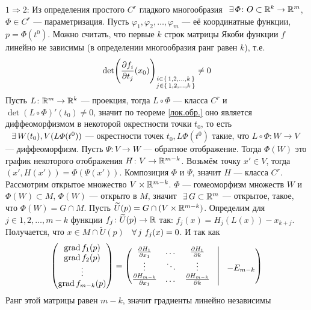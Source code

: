 \begin{prf}
	$1 \Rightarrow 2$: Из определения простого $C^r$ гладкого многообразия$\E \varPhi \colon O \subset \rr^k \to \rmm$, $\varPhi \in C^r$ --- параметризация. Пусть $\varphi_1, \varphi_2, \ldots, \varphi_m$ --- её координатные функции, $p = \varPhi(t^0)$. Можно считать, что первые $k$ строк матрицы Якоби функции $f$ линейно не зависимы (в определении многообразия ранг равен $k$), т.е.\[\det \Biggl(\frac{\partial f_i}{\partial t_j} (x_0)\Biggr)_{\substack{i \in \{\,1, 2, \ldots, k \, \} \\ j \in \{\,1, 2, \ldots, k \, \}}} \ne 0\]
	Пусть $L \colon \mathbb R^m \to \mathbb R^k$ --- проекция, тогда $L \circ \varPhi$ --- класса $C^r$ и $\det (L \circ \varPhi)'(t_0) \ne 0$, значит по теореме \ref{лок.обр.} оно является диффеоморфизмом в некоторой окрестности точки $t_0$, то есть$\E W(t_0), V(L\varPhi(t^0))$ --- окрестности точек $t_0, L\varPhi(t^0)$ такие, что $L \circ \varPhi \colon W \to V$ --- диффеоморфизм. Пусть $\Psi \colon V \to W$ --- обратное отображение. Тогда $\varPhi(W)$ это график некоторого отображения $H \colon V \to \mathbb R^{m - k}$. Возьмём точку $x' \in V$, тогда $(x', H(x')) = \varPhi(\Psi(x'))$. Композиция $\varPhi$ и $\Psi$, значит $H$ --- класса $C^r$. Рассмотрим открытое множество $V \times \mathbb R^{m - k}$. $\varPhi$ --- гомеоморфизм множеств $W$ и $\varPhi(W) \subset M$, $\varPhi(W)$ --- открыто в $M$, значит$\E G \subset \rmm$ --- открытое, такое, что $\varPhi(W) = G \cap M$. Пусть $\widetilde U(p) = G \cap (V \times \mathbb R^{m - k})$. Определим для $j \in {1, 2, \ldots, m - k}$ функции $f_j \colon \widetilde U(p) \to \mathbb R$ так: $f_j(x) = H_j(L(x)) - x_{k + j}$.
	Получается, что $x \in M \cap \widetilde U(p)$ \eq\ 
	$\forall \, j\ f_j(x) = 0$. И так как
	\[\begin{pmatrix}
		\grad f_1(p) \\
		\grad f_2(p) \\
		\vdots \\
		\grad f_{m - k}(p) \\
	\end{pmatrix} = \begin{pmatrix}
	\pfrac{H_1}{x_1} & \dots & \pfrac{H_1}{k} & \vline& \\
	\vdots & \ddots & \vdots & \vline & -E_{m - k}\\
	\pfrac{H_{m - k}}{x_1} & \dots & \pfrac{H_{m - k}}{k} & \vline&\\
	\end{pmatrix}\]
	Ранг этой матрицы равен $m - k$, значит градиенты линейно независимы\\

\end{prf}

